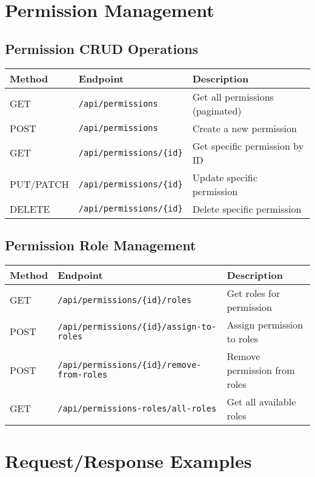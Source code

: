 \documentclass[12pt,a4paper]{article}
\begin{document}
\section{Permission Management}

\subsection{Permission CRUD Operations}

\begin{longtable}{|p{}|p{}|p{}|}
\hline
\textbf{Method} & \textbf{Endpoint} & \textbf{Description} \\
\hline
\endhead

GET & \texttt{/api/permissions} & Get all permissions (paginated) \\
POST & \texttt{/api/permissions} & Create a new permission \\
GET & \texttt{/api/permissions/\{id\}} & Get specific permission by ID \\
PUT/PATCH & \texttt{/api/permissions/\{id\}} & Update specific permission \\
DELETE & \texttt{/api/permissions/\{id\}} & Delete specific permission \\
\hline
\end{longtable}

\subsection{Permission Role Management}

\begin{longtable}{|p{}|p{}|p{}|}
\hline
\textbf{Method} & \textbf{Endpoint} & \textbf{Description} \\
\hline
\endhead

GET & \texttt{/api/permissions/\{id\}/roles} & Get roles for permission \\
POST & \texttt{/api/permissions/\{id\}/assign-to-roles} & Assign permission to roles \\
POST & \texttt{/api/permissions/\{id\}/remove-from-roles} & Remove permission from roles \\
GET & \texttt{/api/permissions-roles/all-roles} & Get all available roles \\
\hline
\end{longtable}

\section{Request/Response Examples}
\end{document}

